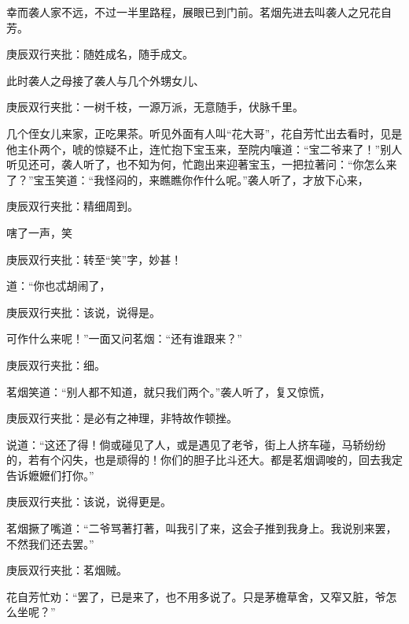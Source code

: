 \begin{parag}
    幸而袭人家不远，不过一半里路程，展眼已到门前。茗烟先进去叫袭人之兄花自芳。\begin{note}庚辰双行夹批：随姓成名，随手成文。\end{note}此时袭人之母接了袭人与几个外甥女儿、\begin{note}庚辰双行夹批：一树千枝，一源万派，无意随手，伏脉千里。\end{note}几个侄女儿来家，正吃果茶。听见外面有人叫“花大哥”，花自芳忙出去看时，见是他主仆两个，唬的惊疑不止，连忙抱下宝玉来，至院内嚷道：“宝二爷来了！”别人听见还可，袭人听了，也不知为何，忙跑出来迎著宝玉，一把拉著问：“你怎么来了？”宝玉笑道：“我怪闷的，来瞧瞧你作什么呢。”袭人听了，才放下心来，\begin{note}庚辰双行夹批：精细周到。\end{note}嗐了一声，笑\begin{note}庚辰双行夹批：转至“笑”字，妙甚！\end{note}道：“你也忒胡闹了，\begin{note}庚辰双行夹批：该说，说得是。\end{note}可作什么来呢！”一面又问茗烟：“还有谁跟来？”\begin{note}庚辰双行夹批：细。\end{note}茗烟笑道：“别人都不知道，就只我们两个。”袭人听了，复又惊慌，\begin{note}庚辰双行夹批：是必有之神理，非特故作顿挫。\end{note}说道：“这还了得！倘或碰见了人，或是遇见了老爷，街上人挤车碰，马轿纷纷的，若有个闪失，也是顽得的！你们的胆子比斗还大。都是茗烟调唆的，回去我定告诉嬷嬷们打你。”\begin{note}庚辰双行夹批：该说，说得更是。\end{note}茗烟撅了嘴道：“二爷骂著打著，叫我引了来，这会子推到我身上。我说别来罢，不然我们还去罢。”\begin{note}庚辰双行夹批：茗烟贼。\end{note}花自芳忙劝：“罢了，已是来了，也不用多说了。只是茅檐草舍，又窄又脏，爷怎么坐呢？”
\end{parag}


